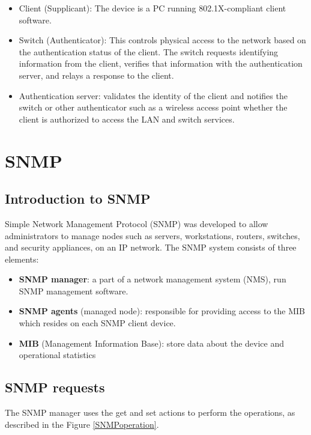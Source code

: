 \begin{itemize}
\item Client (Supplicant): The device is a PC running 802.1X-compliant client software.
\item Switch (Authenticator): This controls physical access to the network based on the authentication status of the client. The switch requests identifying information from the client, verifies that information with the authentication server, and relays a response to the client.
\item Authentication server: validates the identity of the client and notifies the switch or other authenticator such as a wireless access point whether the client is authorized to access the LAN and switch services.
\end{itemize}

\section{SNMP}

\subsection{Introduction to SNMP}

Simple Network Management Protocol (SNMP) was developed to allow administrators to manage nodes such as servers, workstations, routers, switches, and security appliances, on an IP network. The SNMP system consists of three elements:

\begin{itemize}
\item \textbf{SNMP manager}: a part of a network management system (NMS), run SNMP management software. 
\item \textbf{SNMP agents} (managed node):  responsible for providing access to the MIB which resides on each SNMP client device.
\item \textbf{MIB} (Management Information Base): store data about the device and operational statistics 
\end{itemize}

\subsection{SNMP requests}

The SNMP manager uses the get and set actions to perform the operations, as described in the Figure \ref{SNMPoperation}.

